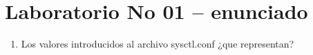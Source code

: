 \section{Laboratorio No 01 – enunciado} 

\begin{enumerate}[1.]
	\item Los valores introducidos al archivo sysctl.conf ¿que representan?
	
	
	

\end{enumerate} 
